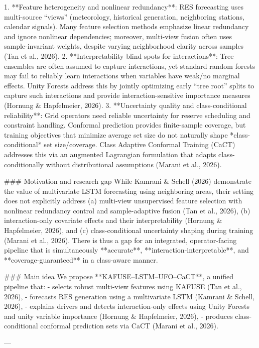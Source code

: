 1. **Feature heterogeneity and nonlinear redundancy**: RES forecasting uses multi-source “views” (meteorology, historical generation, neighboring stations, calendar signals). Many feature selection methods emphasize linear redundancy and ignore nonlinear dependencies; moreover, multi-view fusion often uses sample-invariant weights, despite varying neighborhood clarity across samples (Tan et al., 2026).  
2. **Interpretability blind spots for interactions**: Tree ensembles are often assumed to capture interactions, yet standard random forests may fail to reliably learn interactions when variables have weak/no marginal effects. Unity Forests address this by jointly optimizing early “tree root” splits to capture such interactions and provide interaction-sensitive importance measures (Hornung & Hapfelmeier, 2026).  
3. **Uncertainty quality and class-conditional reliability**: Grid operators need reliable uncertainty for reserve scheduling and constraint handling. Conformal prediction provides finite-sample coverage, but training objectives that minimize average set size do not naturally shape *class-conditional* set size/coverage. Class Adaptive Conformal Training (CaCT) addresses this via an augmented Lagrangian formulation that adapts class-conditionally without distributional assumptions (Marani et al., 2026).

### Motivation and research gap  
While Kamrani & Schell (2026) demonstrate the value of multivariate LSTM forecasting using neighboring areas, their setting does not explicitly address (a) multi-view unsupervised feature selection with nonlinear redundancy control and sample-adaptive fusion (Tan et al., 2026), (b) interaction-only covariate effects and their interpretability (Hornung & Hapfelmeier, 2026), and (c) class-conditional uncertainty shaping during training (Marani et al., 2026). There is thus a gap for an integrated, operator-facing pipeline that is simultaneously **accurate**, **interaction-interpretable**, and **coverage-guaranteed** in a class-aware manner.

### Main idea  
We propose **KAFUSE–LSTM–UFO–CaCT**, a unified pipeline that:
- selects robust multi-view features using KAFUSE (Tan et al., 2026),
- forecasts RES generation using a multivariate LSTM (Kamrani & Schell, 2026),
- explains drivers and detects interaction-only effects using Unity Forests and unity variable importance (Hornung & Hapfelmeier, 2026),
- produces class-conditional conformal prediction sets via CaCT (Marani et al., 2026).

---

